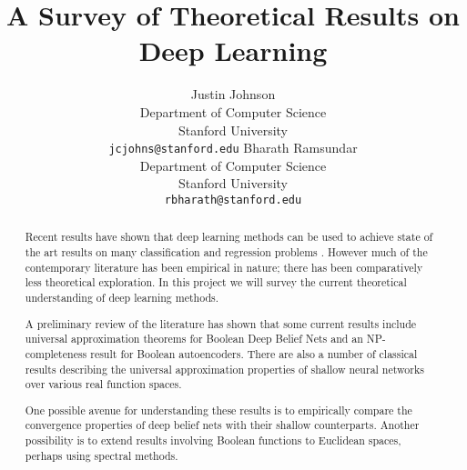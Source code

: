 \documentclass{article} %
\title{A Survey of Theoretical Results on Deep Learning}
\author{
  Justin Johnson \\
  Department of Computer Science \\
  Stanford University \\
  \texttt{jcjohns@stanford.edu}
  \And
  Bharath Ramsundar \\
  Department of Computer Science \\
  Stanford University \\
  \texttt{rbharath@stanford.edu}
}
\begin{document}
\maketitle

\begin{abstract}
  Recent results have shown that deep learning methods can be used to achieve state of the art results on many classification and regression problems \cite{krizhevsky2012imagenet}. However much of the contemporary literature has been empirical in nature; there has been comparatively less theoretical exploration. In this project we will survey the current theoretical understanding of deep learning methods.

A preliminary review of the literature has shown that some current results include universal approximation theorems for Boolean Deep Belief Nets \cite{le2010deep,sutskever2008deep} and an NP-completeness result for Boolean autoencoders\cite{baldi2012autoencoders}. There are also a number of classical results describing the universal approximation properties of shallow neural networks over various real function spaces\cite{siegelmann1995computational}.

One possible avenue for understanding these results is to empirically compare the convergence properties of deep belief nets with their shallow counterparts. Another possibility is to extend results involving Boolean functions to Euclidean spaces, perhaps using spectral methods.
\end{abstract}



\end{document}
